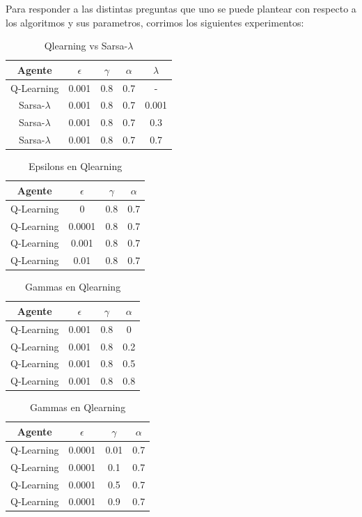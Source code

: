 \documentclass[11pt, a4paper]{article}
\newcommand{\slambda}{Sarsa-$\lambda$ }
\begin{document}
Para responder a las distintas preguntas que uno se puede plantear con respecto a los algoritmos y sus parametros, corrimos los siguientes experimentos:

\bigskip

\begin{table}[h]
\center
\begin{tabular}{ | c | c | c | c | c| }
  \hline
  Agente & $\epsilon$ & $\gamma$ & $\alpha$ & $\lambda$ \\
  \hline 
 	 Q-Learning  & 0.001  & 0.8  & 0.7 & - \\
	\slambda & 0.001  & 0.8  & 0.7 & 0.001 \\
	\slambda & 0.001  & 0.8  & 0.7 & 0.3 \\
	\slambda  & 0.001  & 0.8  & 0.7 & 0.7\\
  \hline
\end{tabular}
\caption {Qlearning vs \slambda}
\end{table}

\begin{table}[h]
\center
\begin{tabular}{ | c | c | c | c | }
  \hline
  Agente & $\epsilon$ & $\gamma$ & $\alpha$ \\
  \hline 
 	 Q-Learning  & 0  & 0.8  & 0.7 \\
	 Q-Learning  & 0.0001  & 0.8  & 0.7 \\
	 Q-Learning  & 0.001  & 0.8  & 0.7 \\
	 Q-Learning  & 0.01  & 0.8  & 0.7 \\
  \hline
\end{tabular}
\caption {Epsilons en Qlearning}
\end{table}

\begin{table}[h]
\center
\begin{tabular}{ | c | c | c | c | }
  \hline
  Agente & $\epsilon$ & $\gamma$ & $\alpha$ \\
  \hline 
 	 Q-Learning  & 0.001  & 0.8  & 0 \\
	 Q-Learning  & 0.001  & 0.8  & 0.2 \\
	 Q-Learning  & 0.001  & 0.8  & 0.5 \\
	 Q-Learning  & 0.001  & 0.8  & 0.8 \\
  \hline
\end{tabular}
\caption {Gammas en Qlearning}
\end{table}

\begin{table}[h]
\center
\begin{tabular}{ | c | c | c | c | }
  \hline
  Agente & $\epsilon$ & $\gamma$ & $\alpha$ \\
  \hline 
 	 Q-Learning  & 0.0001  & 0.01  & 0.7 \\
	 Q-Learning  & 0.0001  & 0.1  & 0.7 \\
	 Q-Learning  & 0.0001  & 0.5  & 0.7 \\
	 Q-Learning  & 0.0001  & 0.9  & 0.7 \\
  \hline
\end{tabular}
\caption {Gammas en Qlearning}
\end{table}
\end{document}
